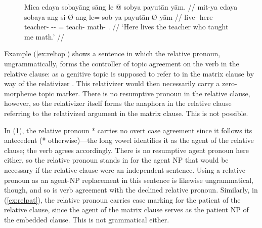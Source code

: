 \begin{figure}
\ex\label{ex:relagt}
\ljudge* \begingl
	\gla Mica edaya sobayāng sāng le @ sobya payutān yām. //
	\glb mit-ya edaya sobaya-ang si-Ø-ang le= sob-ya payutān-Ø yām //
	\glc live-\TsgM{} here teacher-\Aarg{} \Rel{}-\Aarg{}-\Aarg{} \PatTI{}= 
		teach-\TsgM{} math-\Top{} \Fsg{}.\Dat{} //
% 
	\glft `Here lives the teacher who taught me math.' //
\endgl
\xe
\end{figure}

Example (\ref{ex:reltop}) shows a sentence in which the relative pronoun, 
ungrammatically, forms the controller of topic agreement on the verb in the 
relative clause:  as a genitive topic is supposed to refer to 
 in the matrix clause by way of the
relativizer . This relativizer would then necessarily carry a
zero-morpheme topic marker. There is no resumptive pronoun in the relative
clause, however, so the relativizer itself forms the anaphora in the relative
clause referring to the relativized argument in the matrix clause. This is not
possible.

In (\ref{ex:relagt}), the relative pronoun * carries no
overt case agreement since it follows its antecedent (*
otherwise)---the long vowel identifies it as the agent of the relative clause;
the verb agrees accordingly. There is no resumptive agent pronoun here either,
so the relative pronoun stands in for the agent NP that would be necessary if
the relative clause were an independent sentence. Using a relative pronoun as
an agent-NP replacement in this sentence is likewise ungrammatical, though, and
so is verb agreement with the declined relative pronoun. Similarly, in
(\ref{ex:relpat}), the relative pronoun carries case marking for the patient of
the relative clause, since the agent of the matrix clause serves as the patient
NP of the embedded clause. This is not grammatical either.

